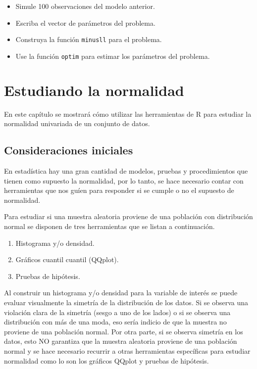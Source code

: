 \documentclass[10pt,]{krantz}
\providecommand{\tightlist}{%
  \setlength{\itemsep}{0pt}\setlength{\parskip}{0pt}}
\begin{document}
\begin{itemize}
\tightlist
\item
  Simule 100 observaciones del modelo anterior.
\item
  Escriba el vector de parámetros del problema.
\item
  Construya la función \texttt{minusll} para el problema.
\item
  Use la función \texttt{optim} para estimar los parámetros del
  problema.
\end{itemize}

\chapter{Estudiando la normalidad}\label{normalidad}

En este capítulo se mostrará cómo utilizar las herramientas de R para
estudiar la normalidad univariada de un conjunto de datos.

\section{Consideraciones iniciales}\label{consideraciones-iniciales}

En estadística hay una gran cantidad de modelos, pruebas y
procedimientos que tienen como supuesto la normalidad, por lo tanto, se
hace necesario contar con herramientas que nos guíen para responder si
se cumple o no el supuesto de normalidad.

Para estudiar si una muestra aleatoria proviene de una población con
distribución normal se disponen de tres herramientas que se listan a
continuación.

\begin{enumerate}
\def\labelenumi{\arabic{enumi}.}
\tightlist
\item
  Histograma y/o densidad.
\item
  Gráficos cuantil cuantil (QQplot).
\item
  Pruebas de hipótesis.
\end{enumerate}

Al construir un histograma y/o densidad para la variable de interés se
puede evaluar visualmente la simetría de la distribución de los datos.
Si se observa una violación clara de la simetría (sesgo a uno de los
lados) o si se observa una distribución con más de una moda, eso sería
indicio de que la muestra no proviene de una población normal. Por otra
parte, si se observa simetría en los datos, esto NO garantiza que la
muestra aleatoria proviene de una población normal y se hace necesario
recurrir a otras herramientas específicas para estudiar normalidad como
lo son los gráficos QQplot y pruebas de hipótesis.
\end{document}
